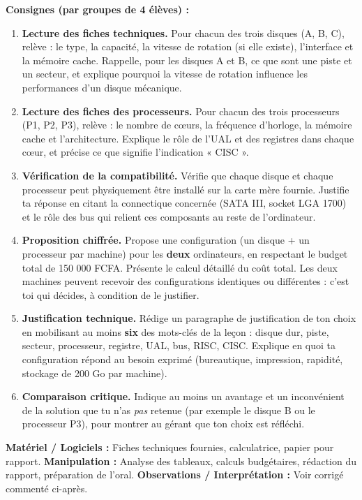 \documentclass[11pt]{article}
\newcommand{\cle}[1]{{\popxbold\color{popdark}#1}}
\begin{document}
\begin{experience}
\textbf{Consignes (par groupes de 4 élèves) :}
\begin{enumerate}
\item \textbf{Lecture des fiches techniques.} Pour chacun des trois disques (A, B, C), relève : le type, la capacité, la vitesse de rotation (si elle existe), l'interface et la mémoire cache. Rappelle, pour les disques A et B, ce que sont une \cle{piste} et un \cle{secteur}, et explique pourquoi la vitesse de rotation influence les performances d'un disque mécanique.
\item \textbf{Lecture des fiches des processeurs.} Pour chacun des trois processeurs (P1, P2, P3), relève : le nombre de cœurs, la fréquence d'horloge, la mémoire cache et l'architecture. Explique le rôle de l'\cle{UAL} et des \cle{registres} dans chaque cœur, et précise ce que signifie l'indication « CISC ».
\item \textbf{Vérification de la compatibilité.} Vérifie que chaque disque et chaque processeur peut physiquement être installé sur la carte mère fournie. Justifie ta réponse en citant la connectique concernée (SATA III, socket LGA 1700) et le rôle des \cle{bus} qui relient ces composants au reste de l'ordinateur.
\item \textbf{Proposition chiffrée.} Propose une configuration (un disque + un processeur par machine) pour les \textbf{deux} ordinateurs, en respectant le budget total de 150 000 FCFA. Présente le calcul détaillé du coût total. Les deux machines peuvent recevoir des configurations identiques ou différentes : c'est toi qui décides, à condition de le justifier.
\item \textbf{Justification technique.} Rédige un paragraphe de justification de ton choix en mobilisant au moins \textbf{six} des mots-clés de la leçon : \cle{disque dur}, \cle{piste}, \cle{secteur}, \cle{processeur}, \cle{registre}, \cle{UAL}, \cle{bus}, \cle{RISC}, \cle{CISC}. Explique en quoi ta configuration répond au besoin exprimé (bureautique, impression, rapidité, stockage de 200 Go par machine).
\item \textbf{Comparaison critique.} Indique au moins un avantage et un inconvénient de la solution que tu n'as \emph{pas} retenue (par exemple le disque B ou le processeur P3), pour montrer au gérant que ton choix est réfléchi.
\end{enumerate}

\textbf{Matériel / Logiciels :} Fiches techniques fournies, calculatrice, papier pour rapport.
\textbf{Manipulation :} Analyse des tableaux, calculs budgétaires, rédaction du rapport, préparation de l'oral.
\textbf{Observations / Interprétation :} Voir corrigé commenté ci-après.
\end{experience}
\end{document}
